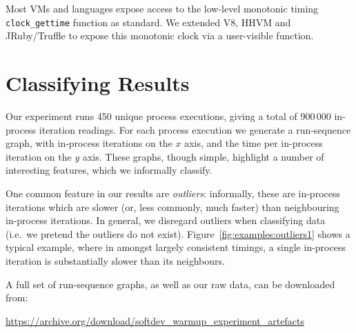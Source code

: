 \documentclass[a4paper,UKenglish]{lipics}
\begin{document}
Most VMs and languages expose access to the low-level monotonic timing
\texttt{clock\_gettime} function as standard. We extended V8, HHVM and JRuby/Truffle
to expose this monotonic clock via a user-visible function.


\section{Classifying Results}
\label{sec:Results}

Our experiment runs 450 unique process executions, giving a total of 900\,000
in-process iteration readings. For each process execution we generate a
run-sequence graph, with in-process iterations on the $x$ axis, and the time
per in-process iteration on the $y$ axis.
These graphs, though simple, highlight a number of
interesting features, which we informally classify.

One common feature in our results are \emph{outliers}: informally, these are
in-process iterations which are slower (or, less commonly, much
faster) than neighbouring in-process iterations. In general, we disregard outliers
when classifying data (i.e.~we pretend the outliers do not exist). Figure~\ref{fig:examples:outliers1}
shows a typical
example, where in amongst largely consistent timings, a single in-process
iteration is substantially slower than its neighbours.

A full set of run-sequence graphs, as well as our raw data, can be downloaded from:
\vspace{-.5em}
\begin{center}
\url{https://archive.org/download/softdev_warmup_experiment_artefacts}
\end{center}
\end{document}
